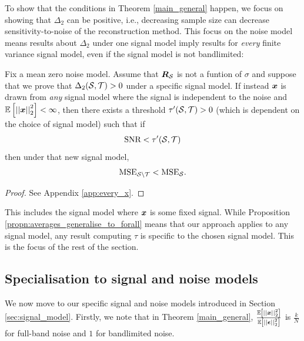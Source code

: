 To show that the conditions in Theorem \ref{main_general} happen, we focus on showing that $\Delta_{2}$ can be positive, i.e., decreasing sample size can decrease sensitivity-to-noise of the reconstruction method.
This focus on the noise model means results about $\Delta_{2}$ under one signal model imply results for \emph{every} finite variance signal model, even if the signal model is not bandlimited:

\begin{propn}
\label{propn:averages_generalise_to_forall}
    Fix a mean zero noise model. Assume that $\bm{R}_{\mathcal{S}}$ is not a funtion of $\sigma$ and suppose that we prove that $\Delta_{2}(\mathcal{S},\mathcal{T}) > 0$ under a specific signal model. If instead $\bm{x}$ is drawn from \emph{any} signal model where the signal is independent to the noise and  $\expect{\sqnormvec{\vect{x}}} < \infty$, then there exists a threshold $\tau'(\mathcal{S},\mathcal{T}) > 0$ (which is dependent on the choice of signal model) such that if
    \begin{equation}
        \textrm{SNR} < \tau'(\mathcal{S},\mathcal{T})
    \end{equation}
    then under that new signal model,
    \begin{equation}
        \textrm{MSE}_{\mathcal{S} \backslash \mathcal{T}}  < \textrm{MSE}_{\mathcal{S}}.
    \end{equation}
\end{propn}
\begin{proof}
    See Appendix \ref{app:every_x}.
\end{proof}  

\noindent This includes the signal model where $\bm{x}$ is some fixed signal. While Proposition \ref{propn:averages_generalise_to_forall} means that our approach applies to any signal model, any result computing $\tau$ is specific to the chosen signal model. This is the focus of the rest of the section.

\subsection{Specialisation to signal and noise models}
\label{sec:every_x}
We now move to our specific signal and noise models introduced in Section \ref{sec:signal_model}. Firstly, we note that in Theorem \ref{main_general}, $\frac{\expect{\sqnormvec{\vect{x}}}}{\expect{\sqnormvec{\vect{\epsilon}}}}$
 is $\frac{k}{N}$ for full-band noise and $1$ for bandlimited noise.

